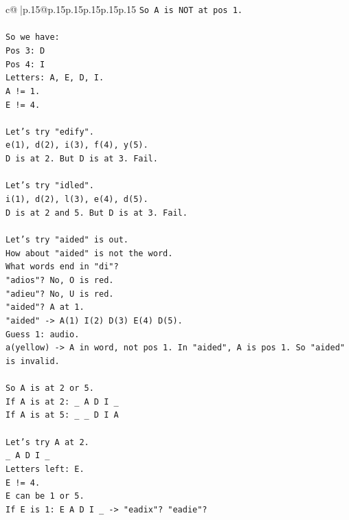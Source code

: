 \documentclass{article}
\begin{document}
{\begin{supertabular}{c@{$\;$}|p{.15\linewidth}@{}p{.15\linewidth}p{.15\linewidth}p{.15\linewidth}p{.15\linewidth}p{.15\linewidth}}
{{{\texttt{So A is NOT at pos 1.} \\
\\ 
\texttt{So we have:} \\
\texttt{Pos 3: D} \\
\texttt{Pos 4: I} \\
\texttt{Letters: A, E, D, I.} \\
\texttt{A != 1.} \\
\texttt{E != 4.} \\
\\ 
\texttt{Let's try "edify".} \\
\texttt{e(1), d(2), i(3), f(4), y(5).} \\
\texttt{D is at 2. But D is at 3. Fail.} \\
\\ 
\texttt{Let's try "idled".} \\
\texttt{i(1), d(2), l(3), e(4), d(5).} \\
\texttt{D is at 2 and 5. But D is at 3. Fail.} \\
\\ 
\texttt{Let's try "aided" is out.} \\
\texttt{How about "aided" is not the word.} \\
\texttt{What words end in "di"?} \\
\texttt{"adios"? No, O is red.} \\
\texttt{"adieu"? No, U is red.} \\
\texttt{"aided"? A at 1.} \\
\texttt{"aided" {-}> A(1) I(2) D(3) E(4) D(5).} \\
\texttt{Guess 1: audio.} \\
\texttt{a(yellow) {-}> A in word, not pos 1. In "aided", A is pos 1. So "aided" is invalid.} \\
\\ 
\texttt{So A is at 2 or 5.} \\
\texttt{If A is at 2: \_ A D I \_} \\
\texttt{If A is at 5: \_ \_ D I A} \\
\\ 
\texttt{Let's try A at 2.} \\
\texttt{\_ A D I \_} \\
\texttt{Letters left: E.} \\
\texttt{E != 4.} \\
\texttt{E can be 1 or 5.} \\
\texttt{If E is 1: E A D I \_ {-}> "eadix"? "eadie"?} \\
}}}
\end{supertabular}}
\end{document}

